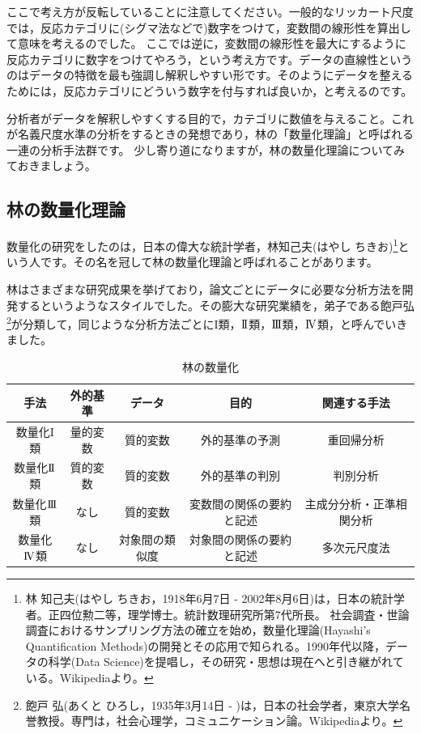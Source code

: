\documentclass{ltjsbook}
\begin{document}
ここで考え方が反転していることに注意してください。一般的なリッカート尺度では，反応カテゴリに(シグマ法などで)数字をつけて，変数間の線形性を算出して意味を考えるのでした。
ここでは逆に，変数間の線形性を最大にするように反応カテゴリに数字をつけてやろう，という考え方です。データの直線性というのはデータの特徴を最も強調し解釈しやすい形です。そのようにデータを整えるためには，反応カテゴリにどういう数字を付与すれば良いか，と考えるのです。

分析者がデータを解釈しやすくする目的で，カテゴリに数値を与えること。これが名義尺度水準の分析をするときの発想であり，林の「数量化理論」と呼ばれる一連の分析手法群です。
少し寄り道になりますが，林の数量化理論についてみておきましょう。

\subsection{林の数量化理論}
数量化の研究をしたのは，日本の偉大な統計学者，林知己夫(はやし ちきお)\footnote{林 知己夫(はやし ちきお，1918年6月7日 - 2002年8月6日)は，日本の統計学者。正四位勲二等，理学博士。統計数理研究所第7代所長。 社会調査・世論調査におけるサンプリング方法の確立を始め，数量化理論(Hayashi's Quantification Methods)の開発とその応用で知られる。1990年代以降，データの科学(Data Science)を提唱し，その研究・思想は現在へと引き継がれている。Wikipediaより。}という人です。その名を冠して林の数量化理論と呼ばれることがあります。

林はさまざまな研究成果を挙げており，論文ごとにデータに必要な分析方法を開発するというようなスタイルでした。その膨大な研究業績を，弟子である飽戸弘\footnote{飽戸 弘(あくと ひろし，1935年3月14日 - )は，日本の社会学者，東京大学名誉教授。専門は，社会心理学，コミュニケーション論。Wikipediaより。}が分類して，同じような分析方法ごとにI類，$\mathrm{I}\hspace{-1.2pt}\mathrm{I}$類，$\mathrm{I}\hspace{-1.2pt}\mathrm{I}\hspace{-1.2pt}\mathrm{I}$類，$\mathrm{I}\hspace{-1.2pt}\mathrm{V}$類，と呼んでいきました。

\begin{table}[ht]
	\caption{林の数量化}
	\begin{tabular}{c|c|c|c|c}
		手法        & 外的基準 & データ     & 目的           & 関連する手法       \\
		\hline
		数量化I類     & 量的変数 & 質的変数    & 外的基準の予測      & 重回帰分析        \\
		数量化$\mathrm{I}\hspace{-1.2pt}\mathrm{I}$ 類 & 質的変数 & 質的変数    & 外的基準の判別      & 判別分析         \\
		数量化$\mathrm{I}\hspace{-1.2pt}\mathrm{I}\hspace{-1.2pt}\mathrm{I}$類  & なし   & 質的変数    & 変数間の関係の要約と記述 & 主成分分析・正準相関分析 \\
		数量化$\mathrm{I}\hspace{-1.2pt}\mathrm{V}$類  & なし   & 対象間の類似度 & 対象間の関係の要約と記述 & 多次元尺度法       \\
	\end{tabular}
	\label{tbl::14_03}
\end{table}
\end{document}
